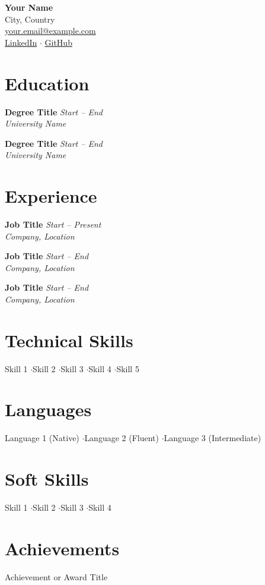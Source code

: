 \documentclass[a4paper,11pt]{article}
\makeatletter
\newcommand{\cventry}[4]{%
    \textbf{#1} \hfill \textit{#2} \\
    \textit{#3} \hfill #4 \par\vspace{4pt}%
}
\newcommand{\myname}{Your Name}
\newcommand{\mylocation}{City, Country}
\newcommand{\myemail}{your.email@example.com}
\newcommand{\mylinkedin}{https://linkedin.com/in/your-profile}
\newcommand{\mygithub}{https://github.com/your-username}
\makeatother
\begin{document}
\begin{center}
    {\LARGE\bfseries \myname} \\[6pt]
    \mylocation \\[3pt]
    \href{mailto:\myemail}{\myemail} \\[3pt]
    \href{\mylinkedin}{LinkedIn} \enspace$\cdot$\enspace
    \href{\mygithub}{GitHub}
\end{center}

\section{Education}

\cventry{Degree Title}{Start -- End}{University Name}{}

\cventry{Degree Title}{Start -- End}{University Name}{}

\section{Experience}

\cventry{Job Title}{Start -- Present}{Company, Location}{}

\cventry{Job Title}{Start -- End}{Company, Location}{}

\cventry{Job Title}{Start -- End}{Company, Location}{}

\section{Technical Skills}

Skill 1 \enspace$\cdot$\enspace Skill 2 \enspace$\cdot$\enspace Skill 3 \enspace$\cdot$\enspace Skill 4 \enspace$\cdot$\enspace Skill 5

\section{Languages}

Language 1 (Native) \enspace$\cdot$\enspace Language 2 (Fluent) \enspace$\cdot$\enspace Language 3 (Intermediate)

\section{Soft Skills}

Skill 1 \enspace$\cdot$\enspace Skill 2 \enspace$\cdot$\enspace Skill 3 \enspace$\cdot$\enspace Skill 4

\section{Achievements}

Achievement or Award Title
\end{document}
